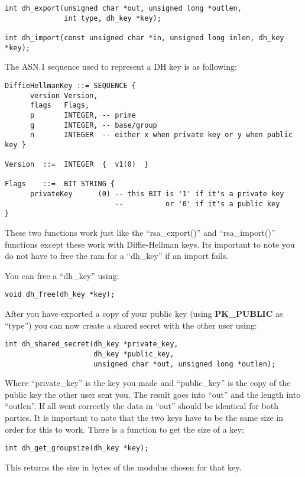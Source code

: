 \documentclass[synpaper]{book}
\begin{document}
 
\begin{verbatim}
int dh_export(unsigned char *out, unsigned long *outlen,
              int type, dh_key *key);

int dh_import(const unsigned char *in, unsigned long inlen, dh_key *key);
\end{verbatim}

The ASN.1 sequence used to represent a DH key is as following:

\begin{verbatim}
DiffieHellmanKey ::= SEQUENCE {
      version Version,
      flags   Flags,
      p       INTEGER, -- prime
      g       INTEGER, -- base/group
      n       INTEGER  -- either x when private key or y when public key }

Version  ::=  INTEGER  {  v1(0)  }

Flags    ::=  BIT STRING {
      privateKey      (0) -- this BIT is '1' if it's a private key
                          --          or '0' if it's a public key
}
\end{verbatim}

These two functions work just like the ``rsa\_export()'' and ``rsa\_import()'' functions except these work with
Diffie-Hellman keys. Its important to note you do not have to free the ram for a ``dh\_key'' if an import fails.

You can free a ``dh\_key'' using:
\begin{verbatim}
void dh_free(dh_key *key);
\end{verbatim}
After you have exported a copy of your public key (using {\bf PK\_PUBLIC} as ``type'') you can now create a shared secret
with the other user using:
\begin{verbatim}
int dh_shared_secret(dh_key *private_key,
                     dh_key *public_key,
                     unsigned char *out, unsigned long *outlen);
\end{verbatim}

Where ``private\_key'' is the key you made and ``public\_key'' is the copy of the public key the other user sent you.  The result goes
into ``out'' and the length into ``outlen''.  If all went correctly the data in ``out'' should be identical for both parties.  It is important to
note that the two keys have to be the same size in order for this to work.  There is a function to get the size of a
key:
\begin{verbatim}
int dh_get_groupsize(dh_key *key);
\end{verbatim}
This returns the size in bytes of the modulus chosen for that key.
\end{document}
